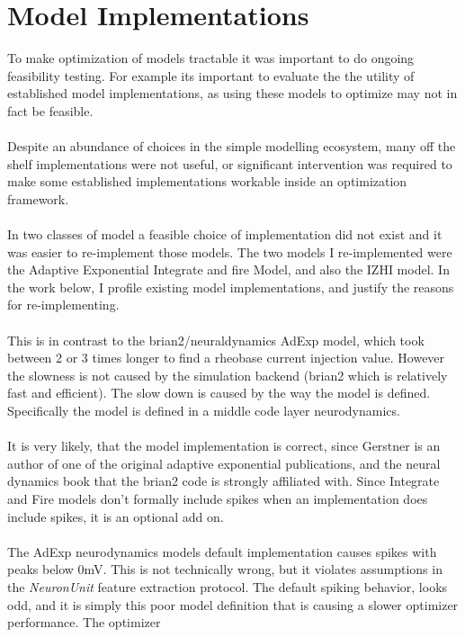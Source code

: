 
    

 \section{Model Implementations}   
To make optimization of models tractable it was important to do ongoing feasibility testing. For example its important to evaluate the the utility of established model implementations, as using these models to optimize may not in fact be feasible.\\ 
\\
Despite an abundance of choices in the simple modelling
ecosystem, many off the shelf implementations were not useful, or significant intervention was required to make some established implementations workable inside an optimization framework. \\
\\
In two classes of model a feasible choice of implementation did not exist and it was easier to re-implement those models. The two models I re-implemented were
the Adaptive Exponential Integrate and fire Model, and also the IZHI
model.  In the work below, I profile existing model implementations, and
justify the reasons for re-implementing.\\
\\
This is in contrast to the brian2/neuraldynamics AdExp model, which took
between 2 or 3 times longer to find a rheobase current injection value. However the slowness is not caused by the simulation backend (brian2 which is relatively fast and efficient). The slow down is caused by the way the model is defined. Specifically the
model is defined in a middle code layer neurodynamics\cite{gerstner2014neuronal}.\\
\\
It is very likely, that the model implementation is correct, since Gerstner is an author of one of the original adaptive exponential publications, and the neural dynamics book that the brian2 code is strongly affiliated with. Since Integrate and Fire models don't formally include spikes when an implementation does include spikes, it is an optional add on.\\
\\
The AdExp neurodynamics models default implementation causes spikes with peaks below 0mV. This is not technically wrong, but it violates
assumptions in the \emph{NeuronUnit} feature extraction protocol. The
default spiking behavior, looks odd, and it is simply this poor model
definition that is causing a slower optimizer performance. The optimizer

